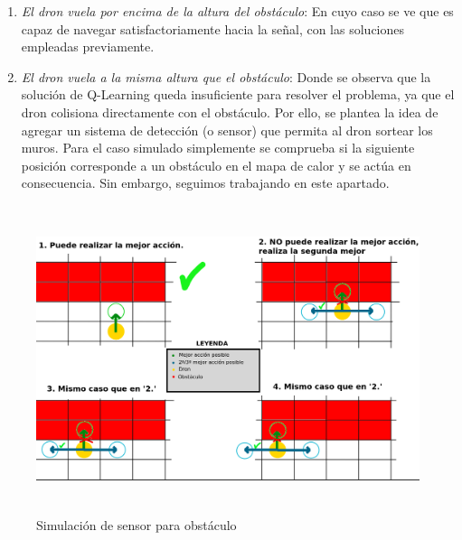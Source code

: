 \begin{enumerate}
    \item \emph{El dron vuela por encima de la altura del obstáculo}: En cuyo caso se ve que es capaz de navegar satisfactoriamente hacia la señal, con las soluciones empleadas previamente.

    \item \emph{El dron vuela a la misma altura que el obstáculo}: Donde se observa que la solución de Q-Learning queda insuficiente para resolver el problema, ya que el dron colisiona directamente con el obstáculo. Por ello, se plantea la idea de agregar un sistema de detección (o sensor) que permita al dron sortear los muros. Para el caso simulado simplemente se comprueba si la siguiente posición corresponde a un obstáculo en el mapa de calor y se actúa en consecuencia. Sin embargo, seguimos trabajando en este apartado.
\end{enumerate}

\begin{figure} [H]
    \begin{center}
    \includegraphics[height=9cm]{imagenes/cap4/28_pseudosensor.png}
    \end{center}
    \caption[Simulación de sensor para obstáculo]{Simulación de sensor para obstáculo}
    \label{fig:pseudosensor}
\end{figure}